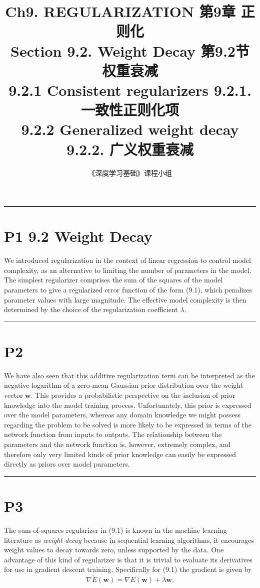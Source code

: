 \documentclass{article}
\title{Ch9. REGULARIZATION \hfill 第9章 正则化 \\ 
Section 9.2. Weight Decay \hfill 第9.2节 权重衰减 \\ 
9.2.1 Consistent regularizers \hfill 9.2.1. 一致性正则化项\\
9.2.2 Generalized weight decay \hfill 9.2.2. 广义权重衰减}
\author{《深度学习基础》课程小组}
\begin{document}
\maketitle

\setlength{\parindent}{0pt} %
\setlength{\parskip}{1.5em} %

\noindent\rule{\linewidth}{0.4pt}

\section{P1 9.2 Weight Decay}

We introduced regularization in the context of linear regression to control model complexity, as an alternative to limiting the number of parameters in the model. The simplest regularizer comprises the sum of the squares of the model parameters to give a regularized error function of the form (9.1), which penalizes parameter values with large magnitude. The effective model complexity is then determined by the choice of the regularization coefficient $\lambda$.

\noindent\rule{\linewidth}{0.4pt}

\section{P2}

We have also seen that this additive regularization term can be interpreted as the negative logarithm of a zero-mean Gaussian prior distribution over the weight vector $\mathbf{w}$. This provides a probabilistic perspective on the inclusion of prior knowledge into the model training process. Unfortunately, this prior is expressed over the model parameters, whereas any domain knowledge we might possess regarding the problem to be solved is more likely to be expressed in terms of the network function from inputs to outputs. The relationship between the parameters and the network function is, however, extremely complex, and therefore only very limited kinds of prior knowledge can easily be expressed directly as priors over model parameters.

\noindent\rule{\linewidth}{0.4pt}

\section{P3}

The sum-of-squares regularizer in (9.1) is known in the machine learning literature as \emph{weight decay} because in sequential learning algorithms, it encourages weight values to decay towards zero, unless supported by the data. One advantage of this kind of regularizer is that it is trivial to evaluate its derivatives for use in gradient descent training. Specifically for (9.1) the gradient is given by
\begin{equation}
\nabla \widetilde{E}(\mathbf{w}) = \nabla E(\mathbf{w}) + \lambda \mathbf{w}.
\tag{9.5}
\end{equation}
\end{document}
